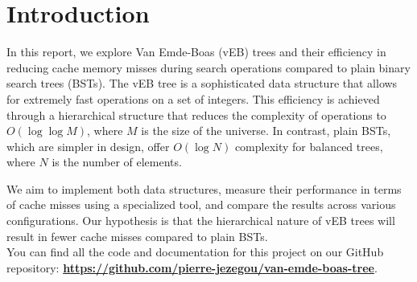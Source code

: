 \section{Introduction}
In this report, we explore Van Emde-Boas (vEB) trees and their efficiency in reducing cache memory misses during search operations compared to plain binary search trees (BSTs). The vEB tree is a sophisticated data structure that allows for extremely fast operations on a set of integers. This efficiency is achieved through a hierarchical structure that reduces the complexity of operations to $O(\log \log M)$, where $M$ is the size of the universe. In contrast, plain BSTs, which are simpler in design, offer $O(\log N)$ complexity for balanced trees, where $N$ is the number of elements.

We aim to implement both data structures, measure their performance in terms of cache misses using a specialized tool, and compare the results across various configurations. Our hypothesis is that the hierarchical nature of vEB trees will result in fewer cache misses compared to plain BSTs.\\

You can find all the code and documentation for this project on our GitHub repository: \textbf{\url{https://github.com/pierre-jezegou/van-emde-boas-tree}}.
